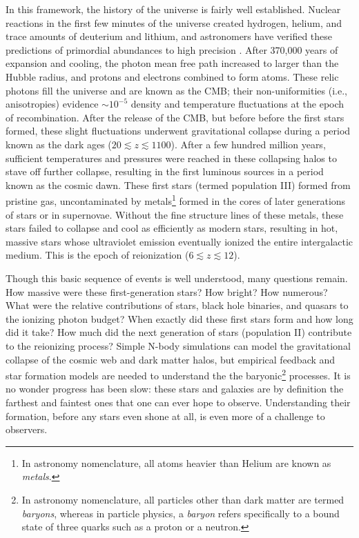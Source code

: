 In this framework, the history of the universe is fairly well established. Nuclear reactions in the first few minutes of the universe created hydrogen, helium, and trace amounts of deuterium and lithium, and astronomers have verified these predictions of primordial abundances to high precision \citep{bbn}. After 370,000 years of expansion and cooling, the photon mean free path increased to larger than the Hubble radius, and protons and electrons combined to form atoms. These relic photons fill the universe and are known as the CMB; their non-uniformities (i.e., anisotropies) evidence $\sim10^{-5}$ density and temperature fluctuations at the epoch of recombination. After the release of the CMB, but before before the first stars formed, these slight fluctuations underwent gravitational collapse during a period known as the dark ages ($20\lesssim z\lesssim 1100$). After a few hundred million years, sufficient temperatures and pressures were reached in these collapsing halos to stave off further collapse, resulting in the first luminous sources in a period known as the cosmic dawn. These first stars (termed population III) formed from pristine gas, uncontaminated by metals\footnote{In astronomy nomenclature, all atoms heavier than Helium are known as \textit{metals}.} formed in the cores of later generations of stars or in supernovae. Without the fine structure lines of these metals, these stars failed to collapse and cool as efficiently as modern stars, resulting in hot, massive stars whose ultraviolet emission eventually ionized the entire intergalactic medium. This is the epoch of reionization ($6\lesssim z\lesssim12$).

Though this basic sequence of events is well understood, many questions remain. How massive were these first-generation stars? How bright? How numerous? What were the relative contributions of stars, black hole binaries, and quasars to the ionizing photon budget? When exactly did these first stars form and how long did it take? How much did the next generation of stars (population II) contribute to the reionizing process? Simple N-body simulations can model the gravitational collapse of the cosmic web and dark matter halos, but empirical feedback and star formation models are needed to understand the the baryonic\footnote{In astronomy nomenclature, all particles other than dark matter are termed \textit{baryons}, whereas in particle physics, a \textit{baryon} refers specifically to a bound state of three quarks such as a proton or a neutron.} processes. It is no wonder progress has been slow: these stars and galaxies are by definition the farthest and faintest ones that one can ever hope to observe. Understanding their formation, before any stars even shone at all, is even more of a challenge to observers. 

